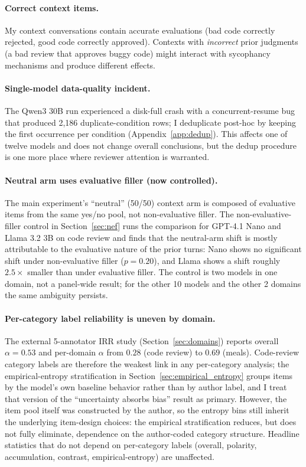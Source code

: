 \documentclass[10pt,twocolumn]{article}
\begin{document}
\paragraph{Correct context items.}
My context conversations contain accurate evaluations (bad code correctly rejected, good code correctly approved).
Contexts with \textit{incorrect} prior judgments (a bad review that approves buggy code) might interact with sycophancy mechanisms and produce different effects.

\paragraph{Single-model data-quality incident.}
The Qwen3 30B run experienced a disk-full crash with a concurrent-resume bug that produced 2,186 duplicate-condition rows; I deduplicate post-hoc by keeping the first occurrence per condition (Appendix~\ref{app:dedup}).
This affects one of twelve models and does not change overall conclusions, but the dedup procedure is one more place where reviewer attention is warranted.

\paragraph{Neutral arm uses evaluative filler (now controlled).}
The main experiment's ``neutral'' (50/50) context arm is composed of evaluative items from the same yes/no pool, not non-evaluative filler. The non-evaluative-filler control in Section~\ref{sec:nef} runs the comparison for GPT-4.1 Nano and Llama 3.2 3B on code review and finds that the neutral-arm shift is mostly attributable to the evaluative nature of the prior turns: Nano shows no significant shift under non-evaluative filler ($p = 0.20$), and Llama shows a shift roughly $2.5\times$ smaller than under evaluative filler. The control is two models in one domain, not a panel-wide result; for the other 10 models and the other 2 domains the same ambiguity persists.

\paragraph{Per-category label reliability is uneven by domain.}
The external 5-annotator IRR study (Section~\ref{sec:domains}) reports overall $\alpha = 0.53$ and per-domain $\alpha$ from $0.28$ (code review) to $0.69$ (meals). Code-review category labels are therefore the weakest link in any per-category analysis; the empirical-entropy stratification in Section~\ref{sec:empirical_entropy} groups items by the model's own baseline behavior rather than by author label, and I treat that version of the ``uncertainty absorbs bias'' result as primary. However, the item pool itself was constructed by the author, so the entropy bins still inherit the underlying item-design choices: the empirical stratification reduces, but does not fully eliminate, dependence on the author-coded category structure. Headline statistics that do not depend on per-category labels (overall, polarity, accumulation, contrast, empirical-entropy) are unaffected.
\end{document}
